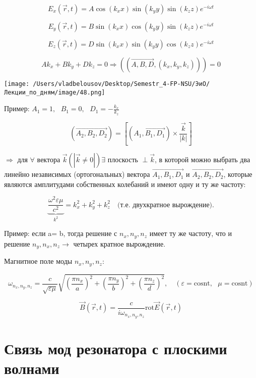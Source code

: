 \documentclass[12pt, a4paper]{report}
\begin{document}
\fi




\[ E_x (\vec{r } ,t ) = A \cos (k_x x ) \sin (k_y y ) \sin (k_z z) e^{- i \omega t}  \] 

\[ E_y (\vec{r } ,t ) = B \sin (k_x x ) \cos (k_y y ) \sin (k_z z) e^{- i \omega t} \] 

\[ E_z (\vec{r } ,t ) = D \sin (k_x x ) \sin (k_y y ) \cos (k_z z) e^{- i \omega t} \] 

\[ A k_x  + B k_y + D k_z = 0 \Rightarrow ((\overrightarrow{A,B,D}, (k_x, k_y, k_z)  )) = 0 \] 

\begin{center}
    \texttt{[image: /Users/vladbelousov/Desktop/Semestr\_4-FP-NSU/ЭиО/Лекции\_по\_дням/image/48.png]}
\end{center}

Пример: \( \displaystyle A_1 =1 , \text{ }  B_1= 0 , \text{ }  D_1 = -\frac{k_x}{k_z}  \) 

\[ (\overrightarrow{A_2,B_2, D_2}  ) = \left[ (\overrightarrow{A_1,B_1, D_1}  ) \times \frac{\vec{k} }{|k|} \right]\] 

\( \Rightarrow  \)  для \( \forall  \)  вектора \( \vec{k } (|\vec{k} \neq 0 |)  \exists \) плоскость \( \perp \vec{k}  \), в которой можно выбрать два линейно независимых (ортогональных) вектора \( \overrightarrow{A_1, B_1, D_1}   \)  и \( \overrightarrow{A_2, B_2, D_2} \), которые являются амплитудами собственных колебаний и имеют одну и ту же частоту:

\[ \displaystyle \underbrace{\frac{\omega ^2 \varepsilon \mu }{c ^2 }}_{k ^2} = k_x ^2 + k_y ^2 + k_z ^2 \quad \text{(т.е. двухкратное вырождение).}  \] 

Пример: если a= b, тогда решение с \( n_x, n_y ,n_z \)  имеет ту же частоту, что и решение \( n_y, n_x, n_z \to  \)  четырех кратное вырождение.

Магнитное поле моды \( n_x, n_y, n_z \):

\[ \omega_{ n_x, n_y ,n_z}  = \frac{c}{\sqrt{\varepsilon \mu}} \sqrt{\left( \frac{\pi n_x}{a}  \right) ^2+ \left( \frac{\pi n_y}{b}  \right) ^2+ \left( \frac{\pi n_z}{d}  \right) ^2} , \quad  (\varepsilon = \mathrm{cosnt} , \text{ } \mu = \mathrm{cosnt}  ) \] 

\[ \vec{B } (\vec{r } , t ) = \frac{c}{i \omega_{ n_x, n_y ,n_z}}  \mathrm{rot } \vec{E} (\vec{r}  ,t )  \] 

\section{Связь мод резонатора с плоскими волнами}
\end{document}
